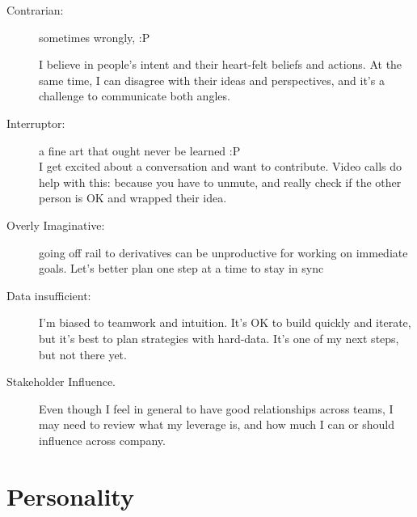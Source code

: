 \documentclass[10pt, a4paper, twocolumn]{article}
\begin{document}
\begin{description}
 \item[Contrarian:] sometimes wrongly, :P
 \item[] \> \> \>
 I believe in people's intent and their heart-felt beliefs and actions. At the same time,
 I can disagree with their ideas and perspectives,
 and it's a challenge to communicate both angles.
 \item[Interruptor:] a fine art that ought never be learned :P \\
 I get excited about a conversation and want to contribute. Video calls do help with this:
 because you have to unmute, and really
 check if the other person is OK and wrapped their idea.
 \item[Overly Imaginative:] going off rail to derivatives can be unproductive for working on immediate goals. Let's better plan one step at a time %
 to stay in sync
 \item[Data insufficient:] I'm biased to teamwork and intuition. It's OK to build quickly and iterate, but %
 it's best to plan strategies with hard-data. %
 It's one of my next steps, but not there yet.
\item[Stakeholder Influence.] Even though I feel in general to have good relationships across teams, I may need to review what my leverage is, and how much I can or should influence across company.
 \end{description}

\vfill\eject


\section*{Personality}

\end{document}
